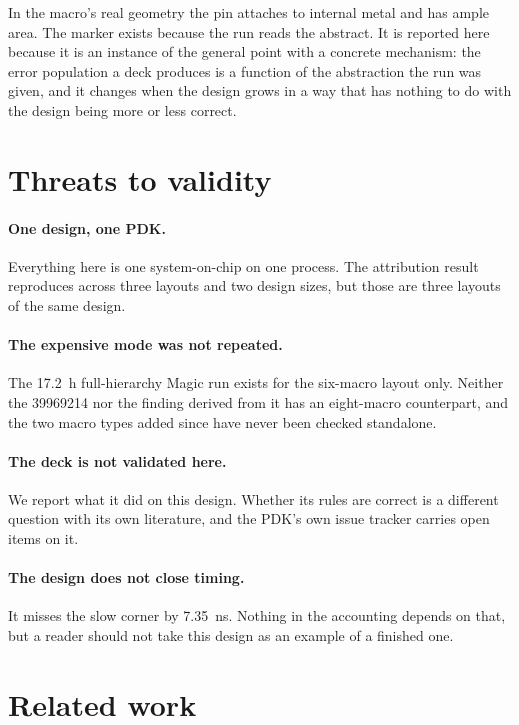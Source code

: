 \documentclass[11pt,a4paper]{article}
\begin{document}
In the macro's real geometry the pin attaches to internal metal and has
ample area. The marker exists because the run reads the abstract. It is
reported here because it is an instance of the general point with a
concrete mechanism: the error population a deck produces is a function of
the abstraction the run was given, and it changes when the design grows
in a way that has nothing to do with the design being more or less
correct.

\section{Threats to validity}
\label{sec:threats}

\paragraph{One design, one PDK.} Everything here is one system-on-chip on
one process. The attribution result reproduces across three layouts and
two design sizes, but those are three layouts of the same design.

\paragraph{The expensive mode was not repeated.} The
\SI{17.2}{\hour} full-hierarchy Magic run exists for the six-macro layout
only. Neither the \num{39969214} nor the finding derived from it has an
eight-macro counterpart, and the two macro types added since have never
been checked standalone.

\paragraph{The deck is not validated here.} We report what it did on this
design. Whether its rules are correct is a different question with its
own literature, and the PDK's own issue tracker carries open items on it.

\paragraph{The design does not close timing.} It misses the slow corner
by \SI{7.35}{\nano\second}. Nothing in the accounting depends on that,
but a reader should not take this design as an example of a finished one.

\section{Related work}
\label{sec:related}
\end{document}
